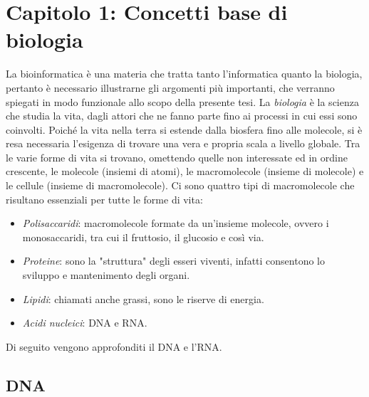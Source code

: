 \chapter{Capitolo 1: Concetti base di biologia}
La bioinformatica è una materia che tratta tanto l'informatica quanto la biologia, pertanto è necessario illustrarne gli argomenti più importanti, che verranno spiegati in modo funzionale allo scopo della presente tesi.
\newline
La \textit{biologia} è la scienza che studia la vita, dagli attori che ne fanno parte fino ai processi in cui essi sono coinvolti. Poiché la vita nella terra si estende dalla biosfera fino alle molecole, si è resa necessaria l'esigenza di trovare una vera e propria scala a livello globale. Tra le varie forme di vita si trovano, omettendo quelle non interessate ed in ordine crescente, le molecole (insiemi di atomi), le macromolecole (insieme di molecole) e le cellule (insieme di macromolecole).
\newline
Ci sono quattro tipi di macromolecole che risultano essenziali per tutte le forme di vita:
\begin{itemize}
	\item \textit{Polisaccaridi}: macromolecole formate da un'insieme molecole, ovvero i monosaccaridi, tra cui il fruttosio, il glucosio e così via.
	\item \textit{Proteine}: sono la "struttura" degli esseri viventi, infatti consentono lo sviluppo e mantenimento degli organi.
	\item \textit{Lipidi}: chiamati anche grassi, sono le riserve di energia.
	\item \textit{Acidi nucleici}: DNA e RNA.
\end{itemize}
Di seguito vengono approfonditi il DNA e l'RNA.

\section{DNA}